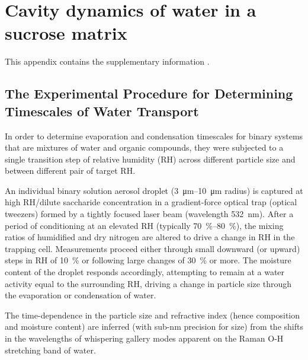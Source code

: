 %
%

\chapter{Cavity dynamics of water in a sucrose matrix}\label{app:wat}
This appendix contains the supplementary information  \cite{songTransientCavityDynamics2020a}. 

\section{The Experimental Procedure for Determining Timescales of Water Transport}

In order to determine evaporation and condensation timescales for binary systems that are mixtures of water and organic compounds, they were subjected to a single transition step of relative humidity (RH) across different particle size and between different pair of target RH. 

An individual binary solution aerosol droplet (\SIrange[range-phrase=--]{3}{10}{\micro\meter} radius) is captured at high RH/dilute saccharide concentration in a gradient-force optical trap (optical tweezers) formed by a tightly focused laser beam (wavelength \SI{532}{\nano\meter}). \cite{powerProbingMicrorheologicalProperties2014}\cite{Song2016a} After a period of conditioning at an elevated RH (typically \SIrange[range-phrase=--]{70}{80}{\percent}), the mixing ratios of humidified and dry nitrogen are altered to drive a change in RH in the trapping cell. Measurements proceed either through small downward (or upward) steps in RH of \SI{10}{\percent} or following large changes of \SI{30}{\percent} or more. The moisture content of the droplet responds accordingly, attempting to remain at a water activity equal to the surrounding RH, driving a change in particle size through the evaporation or condensation of water. 

The time-dependence in the particle size and refractive index (hence composition and moisture content) are inferred (with sub-\si{\nano\meter} precision for size) from the shifts in the wavelengths of whispering gallery modes apparent on the Raman O-H stretching band of water. \cite{prestonAccurateEfficientDetermination2013}\cite{reidSpectroscopicStudiesSize2007}\cite{reidLaserProbingSingleaerosol2006}

